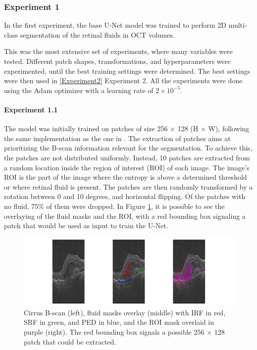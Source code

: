 \subsubsection{Experiment 1}\label{Experiment1}
In the first experiment, the base U-Net model was trained to perform 2D multi-class segmentation of the retinal fluids in OCT volumes.
\par
This was the most extensive set of experiments, where many variables were tested. Different patch shapes, transformations, and hyperparameters were experimented, until the best training settings were determined. The best settings were then used in \ref{Experiment2} Experiment 2. All the experiments were done using the Adam optimizer \parencite{Kingma2015} with a learning rate of $2 \times 10^{-5}$.

\paragraph{Experiment 1.1}
The model was initially trained on patches of size 256 $\times$ 128 (H $\times$ W), following the same implementation as the one in \textcite{Tennakoon2018}. The extraction of patches aims at prioritizing the B-scan information relevant for the segmentation. To achieve this, the patches are not distributed uniformly. Instead, 10 patches are extracted from a random location inside the region of interest (ROI) of each image. The image's ROI is the part of the image where the entropy is above a determined threshold or where retinal fluid is present. The patches are then randomly transformed by a rotation between 0 and 10 degrees, and horizontal flipping. Of the patches with no fluid, 75\% of them were dropped. In Figure \ref{fig:FluidAndROI}, it is possible to see the overlaying of the fluid masks and the ROI, with a red bounding box signaling a patch that would be used as input to train the U-Net.

\begin{figure}[!ht]
	\centering
	\includegraphics[width=1.0\linewidth]{figures/FluidAndROI.png}
	\caption{Cirrus B-scan (left), fluid masks overlay (middle) with IRF in red, SRF in green, and PED in blue, and the ROI mask overlaid in purple (right). The red bounding box signals a possible 256 $\times$ 128 patch that could be extracted.}
	\label{fig:FluidAndROI}
\end{figure}

